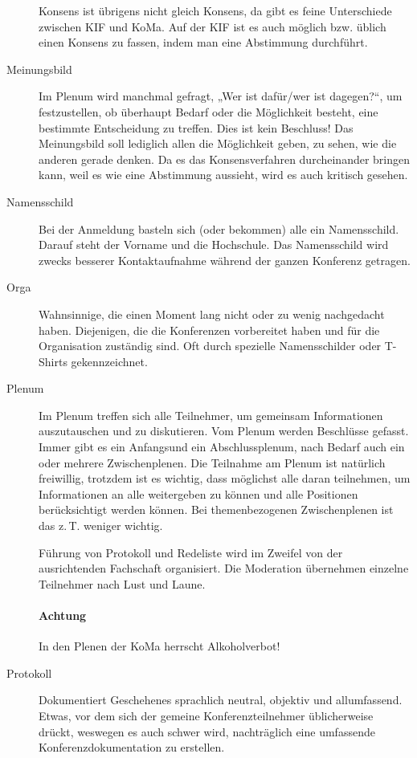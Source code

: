 \begin{description}
	Konsens ist übrigens nicht gleich Konsens, da gibt es feine Unterschiede
	zwischen KIF und KoMa. Auf der KIF ist es auch möglich bzw. üblich einen
	Konsens zu fassen, indem man eine Abstimmung durchführt.

\item[Meinungsbild] Im Plenum wird manchmal gefragt, „Wer ist dafür/wer ist
	dagegen?“, um festzustellen, ob überhaupt Bedarf oder die Möglichkeit
	besteht, eine bestimmte Entscheidung zu treffen. Dies ist kein Beschluss!
	Das Meinungsbild soll lediglich allen die Möglichkeit geben, zu sehen, wie
	die anderen gerade denken. Da es das Konsensverfahren durcheinander bringen
	kann, weil es wie eine Abstimmung aussieht, wird es auch kritisch gesehen.

\item[Namensschild] Bei der Anmeldung basteln sich (oder bekommen) alle ein
	Namensschild. Darauf steht der Vorname und die Hochschule. Das Namensschild
	wird zwecks besserer Kontaktaufnahme während der ganzen Konferenz getragen.

\item[Orga] Wahnsinnige, die einen Moment lang nicht oder zu wenig nachgedacht
	haben. Diejenigen, die die Konferenzen vorbereitet haben und für die
	Organisation zuständig sind.  Oft durch spezielle Namensschilder oder
	T-Shirts gekennzeichnet.

\item[Plenum] Im Plenum treffen sich alle Teilnehmer, um gemeinsam
	Informationen auszutauschen und zu diskutieren. Vom Plenum werden
	Beschlüsse gefasst. Immer gibt es ein Anfangsund ein Abschlussplenum, nach
	Bedarf auch ein oder mehrere Zwischenplenen. Die Teilnahme am Plenum ist
	natürlich freiwillig, trotzdem ist es wichtig, dass möglichst alle daran
	teilnehmen, um Informationen an alle weitergeben zu können und alle
	Positionen berücksichtigt werden können. Bei themenbezogenen Zwischenplenen
	ist das z.\,T.  weniger wichtig.

	Führung von Protokoll und Redeliste wird im Zweifel von der ausrichtenden
	Fachschaft organisiert. Die Moderation übernehmen einzelne Teilnehmer nach
	Lust und Laune.

	\paragraph{Achtung} In den Plenen der KoMa herrscht Alkoholverbot!

\item[Protokoll] Dokumentiert Geschehenes sprachlich neutral, objektiv und
	allumfassend. Etwas, vor dem sich der gemeine Konferenzteilnehmer
	üblicherweise drückt, weswegen es auch schwer wird, nachträglich eine
	umfassende Konferenzdokumentation zu erstellen.


\end{description}
